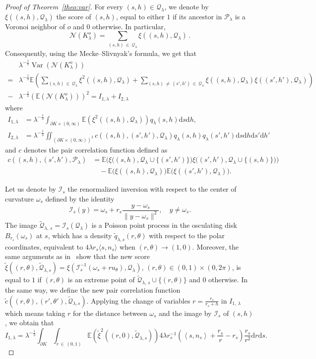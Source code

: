 \documentclass[10pt]{amsart}
\theoremstyle{definition}\newtheorem{defi}[theo]{Definition}\newtheorem{rema}[theo]{Remark}\newtheorem{exam}[theo]{Example}\newtheorem{exem}[theo]{Example}\newtheorem{nota}[theo]{Notation}
\newcommand{\cN}{\mathcal{N}}
\newcommand{\cP}{\mathcal{P}}
\newcommand{\cQ}{\mathcal{Q}}
\newcommand{\cI}{\mathcal{I}}
\newcommand{\la}{\lambda}
\newcommand{\dd}{\mathrm{d}}
\newcommand{\E}{\mathbb{E}}
\DeclareMathOperator{\Var}{Var}
\newcommand{\pass}{\vspace{0.3cm}\noindent}
\newcommand{\noi}{\noindent}
\begin{document}
\begin{proof}[{Proof of Theorem~\ref{theo:var}}]
 For every $(s,h)\in \cQ_\la$, we denote by $\xi((s,h),\cQ_\la)$ the score of $(s,h)$, equal to either $1$ if its ancestor in $\cP_\lambda$ is a Voronoi neighbor of $o$ and $0$ otherwise. In particular,
\[
{\cN}(K_{\lambda}^o)=\sum_{(s,h)\,\in\,\cQ_\la} \xi\left((s,h),\cQ_\la\right)\,.
\]
Consequently, using the Mecke--Slivnyak's formula, we get that
\begin{align}
&\la^{-\frac{1}{3}}\Var(\cN(K_{\lambda}^o))\nonumber\\
=&\la^{-\frac{1}{3}}\E\left(\sum_{(s,h)\,\in\, \cQ_\la}\xi^2((s,h),\cQ_\la)+\sum_{(s,h)\,\ne\, (s',h')\,\in\, \cQ_\la}\xi\left((s,h),\cQ_\la\right)\xi\left((s',h'),\cQ_\la\right)\right)\nonumber\\
-&\la^{-\frac{1}{3}}\left(\E(\cN(K_{\lambda}^o))\right)^2=I_{1,\lambda}+I_{2,\lambda}\label{eq:decompvar}
\end{align}
where
\begin{align*}
I_{1,\lambda}&=\lambda^{-\frac{1}{3}}\int_{\partial K\times (0,\infty)}\E\left(\xi^2((s,h),\cQ_\la)\right)q_\lambda(s,h)\dd s\dd h,\\
I_{2,\lambda}&=\lambda^{-\frac{1}{3}}\iint_{(\partial K\times (0,\infty))^2}c\left((s,h),(s',h'),\cQ_\la\right)q_\lambda(s,h)q_\lambda(s',h')\dd s\dd h\dd s'\dd h'
\end{align*}
and $c$ denotes the pair correlation function defined as
\begin{align*}
c\left((s,h),(s',h'),\cP_\la\right)&=\E\Big(\xi\big((s,h),\cQ_\la\cup\{(s',h')\}\big)\xi\big((s',h'),\cQ_\la\cup\{(s,h)\}\big)\Big)\\
&\quad-\E\big(\xi((s,h),\cQ_\la)\big)\E\big(\xi((s',h'),\cQ_\la)\big).
\end{align*}

Let us denote by $\cI_s$ the renormalized inversion with respect to the center of curvature $\omega_s$ defined by the identity
\[
\cI_s(y)=\omega_s+r_s\frac{y-\omega_s}{\|y-\omega_s\|^2},\quad y\ne \omega_s.
\]
The image $\widetilde{\cQ}_{\la,\,s}=\cI_s(\cQ_\la)$ is a Poisson point process in the osculating disk $B_{r_s}(\omega_s)$ at $s$, which has a density $\widetilde{q}_{\lambda,s}(r,\theta)$ with respect to the polar coordinates, equivalent to $4\lambda r_s\langle s,n_s\rangle$ when $(r,\theta)\to (1,0)$. Moreover, the same arguments as in~\cite[Lemma~1]{cs05} show that the new score $\widetilde{\xi}((r,\theta),\widetilde{\cQ}_{\la,s})=\xi(\cI_s^{-1}(\omega_s+ru_{\theta}),\cQ_\la)$, $(r,\theta)\in (0,1)\times(0,2\pi)$, is equal to $1$ if $(r,\theta)$ is an extreme point of $\widetilde{\cQ}_{\la,\,s}\cup\{(r,\theta)\}$ and $0$ otherwise. In the same way, we define the new pair correlation function $\widetilde{c}((r,\theta), (r',\theta'),\widetilde{\cQ}_{\la,s})$. Applying the change of variables $r=\frac{r_s}{r_s+h}$ in $I_{1,\,\lambda}$ which means taking $r$ for the distance between $\omega_s$ and the image by $\cI_s$ of $(s,h)$, we obtain that
\[
I_{1,\lambda}= \lambda^{-\frac{1}{3}}\int_{\partial K}\int_{r\,\in\,(0,1)}\E\left(\widetilde{\xi}^2\left((r,0),\widetilde{\cQ}_{\la,s}\right)\right)4\lambda r_s^{-1}\left(\left\langle s,n_s\right\rangle+\frac{r_s}{r}-r_s\right)\frac{r_s}{r^2}\dd r\dd s.
\]


\end{proof}
\end{document}
